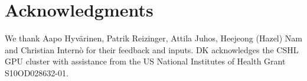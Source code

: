 \documentclass{article}
\begin{document}
\section*{Acknowledgments}
We thank Aapo Hyv\"arinen, Patrik Reizinger, Attila Juhos, Heejeong (Hazel) Nam and Christian Intern\`o for their feedback and inputs.
DK acknowledges the CSHL GPU cluster with assistance from the US National Institutes of Health Grant S10OD028632-01.







\newpage
\appendix

\end{document}
